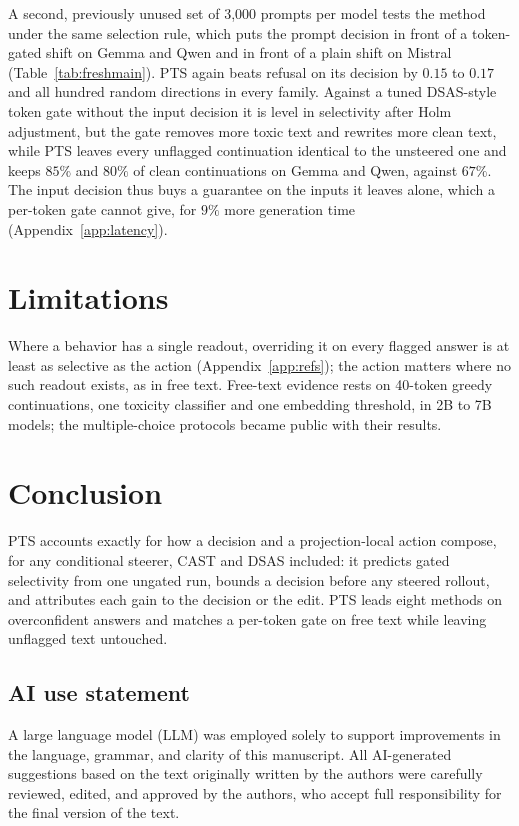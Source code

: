 A second, previously unused set of 3{,}000 prompts per model tests the method
under the same selection rule, which puts the prompt decision in front of a
token-gated shift on Gemma and Qwen and in front of a plain shift on Mistral
(Table~\ref{tab:freshmain}). PTS again beats refusal on its decision by $0.15$
to $0.17$ and all hundred random directions in every family. Against a tuned
DSAS-style token gate without the input decision it is level in selectivity
after Holm adjustment, but the gate removes more toxic text and rewrites more
clean text, while PTS leaves every unflagged continuation identical to the
unsteered one and keeps $85\%$ and $80\%$ of clean continuations on Gemma and
Qwen, against $67\%$. The input decision thus buys a guarantee on the inputs
it leaves alone, which a per-token gate cannot give, for $9\%$ more generation
time (Appendix~\ref{app:latency}).



\section{Limitations}

Where a behavior has a single readout, overriding it on every flagged answer
is at least as selective as the action (Appendix~\ref{app:refs}); the action
matters where no such readout exists, as in free text. Free-text evidence
rests on 40-token greedy continuations, one toxicity classifier and one
embedding threshold, in 2B to 7B models; the multiple-choice protocols became
public with their results.

\section{Conclusion}

PTS accounts exactly for how a decision and a projection-local action
compose, for any conditional steerer, CAST and DSAS included: it predicts
gated selectivity from one ungated run, bounds a decision before any steered
rollout, and attributes each gain to the decision or the edit. PTS leads
eight methods on overconfident answers and matches a per-token gate on free
text while leaving unflagged text untouched.
\subsection*{AI use statement}

A large language model (LLM) was employed solely to support improvements in the
language, grammar, and clarity of this manuscript. All AI-generated suggestions
based on the text originally written by the authors were carefully reviewed,
edited, and approved by the authors, who accept full responsibility for the
final version of the text.

